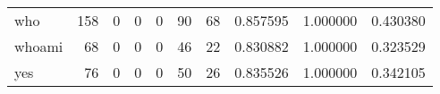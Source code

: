 \begin{longtable}{lrrrrrrrrr}
who       &                                   158 &                                                  0 &                                                  0 &                                                  0 &                                                 90 &                                                 68 &                                           0.857595 &                               1.000000 &                             0.430380 \\
whoami    &                                    68 &                                                  0 &                                                  0 &                                                  0 &                                                 46 &                                                 22 &                                           0.830882 &                               1.000000 &                             0.323529 \\
yes       &                                    76 &                                                  0 &                                                  0 &                                                  0 &                                                 50 &                                                 26 &                                           0.835526 &                               1.000000 &                             0.342105 \\
\end{longtable}
